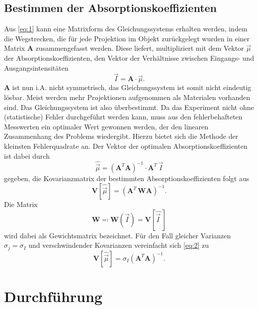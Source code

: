 \subsection{Bestimmen der Absorptionskoeffizienten}
Aus \eqref{eq:1} kann eine Matrixform des Gleichungssystems erhalten werden, indem
die Wegstrecken, die für jede Projektion im Objekt zurückgelegt wurden in einer
Matrix $\mathbf{A}$ zusammengefasst werden.
Diese liefert, multipliziert mit dem Vektor
$\vec{\mu}$ der Absorptionskoeffizienten, den Vektor der Verhältnisse zwischen
Eingangs- und Ausgangsintensitäten
\begin{equation}
  \vec{I} = \mathbf{A} \cdot \vec{\mu}.
\end{equation}
$\mathbf{A}$ ist nun i.A. nicht symmetrisch, das Gleichungssystem ist somit nicht
eindeutig lösbar.
Meist werden mehr Projektionen aufgenommen als Materialen vorhanden sind.
Das Gleichungssystem ist also überbestimmt.
Da das Experiment nicht ohne (statistische) Fehler durchgeführt werden kann,
muss aus den fehlerbehafteten Messwerten ein optimaler Wert gewonnen werden, der
den linearen Zusammenhang des Problems wiedergibt.
Hierzu bietet sich die Methode der kleinsten Fehlerquadrate an.
Der Vektor der optimalen Absorptionskoeffizienten ist dabei durch
\begin{equation}
  \hat{\vec{\mu}} = \left(\mathbf{A}^{T} \mathbf{A} \right)^{-1} \cdot \mathbf{A}^{T} \, \vec{I}
\end{equation}
gegeben, die Kovarianzmatrix der bestimmten Absorptionskoeffizienten folgt aus
\begin{equation}
  \label{eq:2}
  \mathbf{V} \left[ \hat{\vec{\mu}} \right] = \left(\mathbf{A}^{T} \, \mathbf{W} \mathbf{A} \right)^{-1}.
\end{equation}
Die Matrix
\begin{equation}
  \mathbf{W} \eqcolon \mathbf{W} \left(\vec{I} \right) = \mathbf{V}\left[\hat{\vec{I}\:\!}\right]
\end{equation}
wird dabei als Gewichtsmatrix bezeichnet.
Für den Fall gleicher Varianzen $\sigma_{j} = \sigma_{I}$ und verschwindender
Kovarianzen vereinfacht sich \eqref{eq:2} zu
\begin{equation}
  \mathbf{V}\left[\hat{\vec{\mu}}\right] = \sigma_{I} \left(\mathbf{A}^{T} \mathbf{A} \right)^{-1}.
\end{equation}


\section{Durchführung}
